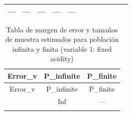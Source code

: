 \documentclass[
]{article}
\begin{document}
\begin{longtable}[]{@{}cccccccccccc@{}}
\begin{minipage}[t]{0.04\columnwidth}
---\strut
\end{minipage} & \begin{minipage}[t]{0.03\columnwidth}\centering
---\strut
\end{minipage} & \begin{minipage}[t]{0.05\columnwidth}\centering
---\strut
\end{minipage} & \begin{minipage}[t]{0.04\columnwidth}\centering
---\strut
\end{minipage} & \begin{minipage}[t]{0.04\columnwidth}\centering
---\strut
\end{minipage}\tabularnewline
\bottomrule
\end{longtable}

\begin{longtable}[]{@{}ccc@{}}
\caption{Tabla de margen de error y tamaños de muestra estimados para
población infinita y finita (variable 1: fixed acidity)}\tabularnewline
\toprule
\begin{minipage}[b]{0.13\columnwidth}\centering
Error\_v\strut
\end{minipage} & \begin{minipage}[b]{0.16\columnwidth}\centering
P\_infinite\strut
\end{minipage} & \begin{minipage}[b]{0.16\columnwidth}\centering
P\_finite\strut
\end{minipage}\tabularnewline
\midrule
\endfirsthead
\toprule
\begin{minipage}[b]{0.13\columnwidth}\centering
Error\_v\strut
\end{minipage} & \begin{minipage}[b]{0.16\columnwidth}\centering
P\_infinite\strut
\end{minipage} & \begin{minipage}[b]{0.16\columnwidth}\centering
P\_finite\strut
\end{minipage}\tabularnewline
\midrule
\endhead
\begin{minipage}[t]{0.13\columnwidth}\centering
0\strut
\end{minipage} & \begin{minipage}[t]{0.16\columnwidth}\centering
Inf\strut
\end{minipage} & \begin{minipage}[t]{0.16\columnwidth}\centering
---\strut
\end{minipage}\tabularnewline
\begin{minipage}[t]{0.13\columnwidth}\centering

\end{minipage}
\end{longtable}
\end{document}
